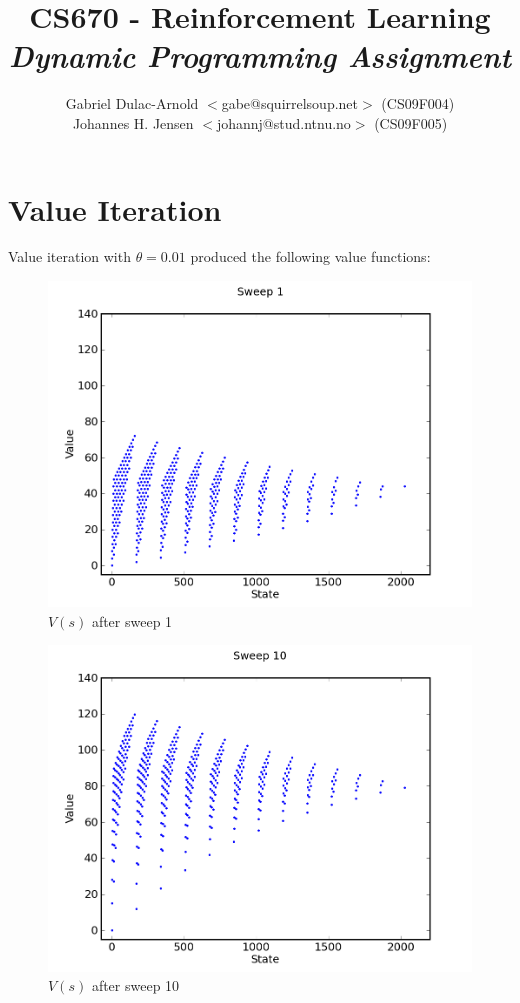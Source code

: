\documentclass[a4paper]{article}
\author{Gabriel Dulac-Arnold $<$gabe@squirrelsoup.net$>$ (CS09F004) \\
Johannes H. Jensen $<$johannj@stud.ntnu.no$>$ (CS09F005)}
\title{CS670 - Reinforcement Learning \\
\emph{Dynamic Programming Assignment}}
\begin{document}
\setlength{\parskip}{2ex}
\maketitle

\section{Value Iteration}

Value iteration with $\theta=0.01$ produced the following value functions:

\begin{figure}[h]
\center
\includegraphics[scale=0.75]{value_iteration/sweep_1.png}
\caption{$V(s)$ after sweep 1}
\end{figure}

\begin{figure}[h]
\center
\includegraphics[scale=0.75]{value_iteration/sweep_10.png}
\caption{$V(s)$ after sweep 10}
\end{figure}
\end{document}
